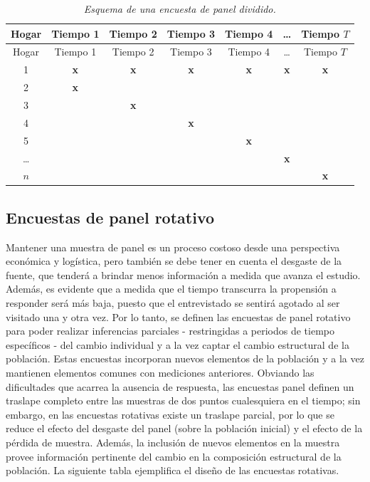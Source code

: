 \documentclass[
  12pt,
  spanish,
]{book}
\begin{document}
\begin{longtable}[]{@{}ccccccc@{}}
\caption{\emph{Esquema de una encuesta de panel dividido.}}\tabularnewline
\toprule
Hogar & Tiempo 1 & Tiempo 2 & Tiempo 3 & Tiempo 4 & \ldots{} & Tiempo \(T\) \\
\midrule
\endfirsthead
\toprule
Hogar & Tiempo 1 & Tiempo 2 & Tiempo 3 & Tiempo 4 & \ldots{} & Tiempo \(T\) \\
\midrule
\endhead
1 & \textbf{x} & \textbf{x} & \textbf{x} & \textbf{x} & \textbf{x} & \textbf{x} \\
2 & \textbf{x} & & & & & \\
3 & & \textbf{x} & & & & \\
4 & & & \textbf{x} & & & \\
5 & & & & \textbf{x} & & \\
\ldots{} & & & & & \textbf{x} & \\
\(n\) & & & & & & \textbf{x} \\
\bottomrule
\end{longtable}

\hypertarget{encuestas-de-panel-rotativo}{%
\subsection*{Encuestas de panel rotativo}\label{encuestas-de-panel-rotativo}}

Mantener una muestra de panel es un proceso costoso desde una perspectiva económica y logística, pero también se debe tener en cuenta el desgaste de la fuente, que tenderá a brindar menos información a medida que avanza el estudio. Además, es evidente que a medida que el tiempo transcurra la propensión a responder será más baja, puesto que el entrevistado se sentirá agotado al ser visitado una y otra vez. Por lo tanto, se definen las encuestas de panel rotativo para poder realizar inferencias parciales - restringidas a periodos de tiempo específicos - del cambio individual y a la vez captar el cambio estructural de la población. Estas encuestas incorporan nuevos elementos de la población y a la vez mantienen elementos comunes con mediciones anteriores. Obviando las dificultades que acarrea la ausencia de respuesta, las encuestas panel definen un traslape completo entre las muestras de dos puntos cualesquiera en el tiempo; sin embargo, en las encuestas rotativas existe un traslape parcial, por lo que se reduce el efecto del desgaste del panel (sobre la población inicial) y el efecto de la pérdida de muestra. Además, la inclusión de nuevos elementos en la muestra provee información pertinente del cambio en la composición estructural de la población. La siguiente tabla ejemplifica el diseño de las encuestas rotativas.
\end{document}
